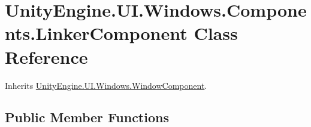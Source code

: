 \hypertarget{class_unity_engine_1_1_u_i_1_1_windows_1_1_components_1_1_linker_component}{}\section{Unity\+Engine.\+U\+I.\+Windows.\+Components.\+Linker\+Component Class Reference}
\label{class_unity_engine_1_1_u_i_1_1_windows_1_1_components_1_1_linker_component}


Inherits \hyperlink{class_unity_engine_1_1_u_i_1_1_windows_1_1_window_component}{Unity\+Engine.\+U\+I.\+Windows.\+Window\+Component}.

\subsection*{Public Member Functions}
